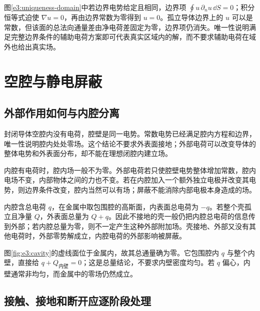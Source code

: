 图\ref{e3:uniqueness-domain}中若边界电势给定且相同，边界项 $\oint u\,\partial_nu\,\dd S=0$；积分恒等式迫使 $\nabla u=0$，再由边界常数为零得到 $u=0$。孤立导体边界上的 $u$ 可以是常数，但该面的总法向通量差由净电荷差固定为零，边界项仍消失。唯一性说明满足完整边界条件的辅助电荷方案即可代表真实区域内的解，而不要求辅助电荷在域外也给出真实场。

\section{空腔与静电屏蔽}
\subsection{外部作用如何与内腔分离}

封闭导体空腔内没有电荷，腔壁是同一电势。常数电势已经满足腔内方程和边界，唯一性说明腔内处处零场。这个结论不要求外表面接地；外部电荷可以改变导体的整体电势和外表面分布，却不能在理想闭腔内建立场。

内腔有电荷时，腔内场一般不为零。外部电荷若只使腔壁电势整体增加常数，腔内电场不变，内部物体之间的力也不变。若在内腔加入一个额外独立电极并改变其电势，则边界条件改变，腔内当然可以有场；屏蔽不能消除内部电极本身造成的场。

内腔含总电荷 $q$，在金属中取包围腔的高斯面，内表面总电荷为 $-q$。若整个壳孤立且净量 $Q$，外表面总量为 $Q+q$。因此不接地的壳一般仍把内腔总电荷的信息传到外部；若内腔总量为零，则不一定产生这种外部附加场。壳接地、外部又没有其他电荷时，外部零势解成立，内腔电荷的外部影响被屏蔽。

图\ref{fig:e3:cavity}的虚线面位于金属内，故其总通量确为零。它包围腔内 $q$ 与整个内壁，直接给 $q+Q_{\text{内壁}}=0$；这是总量结论，不要求内壁密度均匀。若 $q$ 偏心，内壁通常非均匀，而金属中的零场仍然成立。

\subsection{接触、接地和断开应逐阶段处理}

